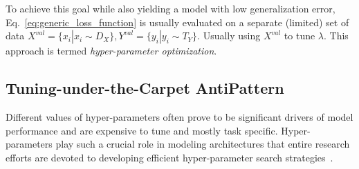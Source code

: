 To achieve this goal while also yielding a model with low generalization error, Eq.~\ref{eq:generic_loss_function} is usually evaluated on a separate (limited) set of data $X^{val} = \{x_i | x_i \mathtt{\sim} D_X\}, Y^{val} = \{y_i | y_i \mathtt{\sim} T_Y \}$. Usually using $X^{val}$ to tune $\lambda$. This approach is termed \textit{hyper-parameter optimization}.
\fi 


\subsection{Tuning-under-the-Carpet AntiPattern}\label{sec:hyperparameter_tuning}
Different values of hyper-parameters often prove to be significant drivers of model performance and are expensive to tune and mostly task specific. Hyper-parameters play such a crucial role in modeling architectures that entire research efforts are devoted to developing efficient hyper-parameter search strategies~\cite{bergstra2013making,nguyen2019bayesian,henderson2018deep,van2018hyperparameter,probst2019tunability}.

